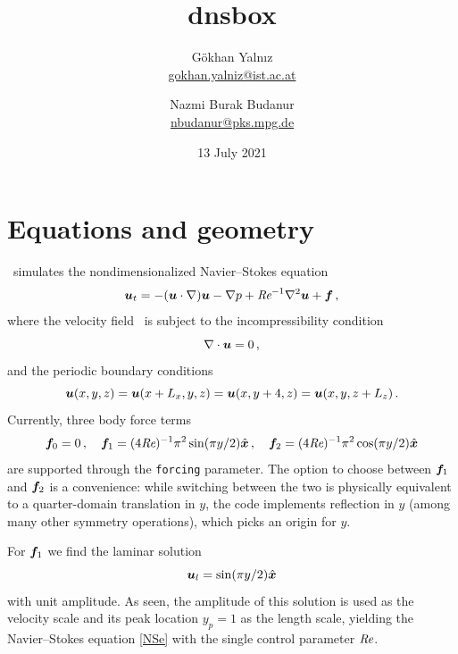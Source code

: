 \documentclass[a4paper, 11pt]{article}
\title{dnsbox}
\date{13 July 2021}
\author{Gökhan Yalnız\\\href{mailto:gokhan.yalniz@ist.ac.at}{
                             gokhan.yalniz@ist.ac.at}
        \and
        Nazmi Burak Budanur\\\href{mailto:nbudanur@pks.mpg.de}{
                                   nbudanur@pks.mpg.de}}
\begin{document}
\maketitle

\section{Equations and geometry} 

\dnsbox\ simulates the nondimensionalized Navier--Stokes equation 
\begin{equation}
    \bm{u}_t = -(\bm{u} \cdot \nabla) \bm{u} - \nabla p
    + \textit{Re}^{-1} \nabla^2 \bm{u} + \bm{f} \,, \label{NSe}
\end{equation}
where the velocity field \vu\ is subject to the incompressibility condition 
\begin{equation}
    \nabla \cdot \bm{u} = 0\,, \label{incompressibility}
\end{equation}
and the periodic boundary conditions 
\begin{equation}
    \bm{u}(x,y,z) = 
    \bm{u}(x + L_x, y, z) = \bm{u}(x, y + 4, z) = \bm{u}(x, y, z + L_z) \,. \label{boundary_conditions}
\end{equation}
Currently, three body force terms 
\begin{equation}
    \bm{f}_0 = 0 \,,\quad
    \bm{f}_1 = (4 \textit{Re})^{-1} \pi^{2} \sin(\pi y / 2) \hat{\bm{x}} \,,\quad
    \bm{f}_2 = (4 \textit{Re})^{-1} \pi^{2} \cos(\pi y / 2) \hat{\bm{x}} 
\end{equation}
are supported through the \texttt{forcing} parameter. The option to 
choose between \(\bm{f}_1\) and \(\bm{f}_2\) is a convenience: while switching 
between the two is physically equivalent to a quarter-domain translation in \(y\),
the code implements reflection in \(y\) (among many other symmetry operations),
which picks an origin for \(y\).

For \(\bm{f}_1\) we find the laminar solution
\begin{equation} 
    \bm{u}_l = \sin(\pi y / 2) \hat{\bm{x}} \label{laminar}
\end{equation}
with unit amplitude. As seen, the amplitude of this solution is used
as the velocity scale and its peak location $y_p=1$ as the length scale, yielding 
the Navier--Stokes equation \cref{NSe} with the single control parameter $\textit{Re}$. 
\end{document}
